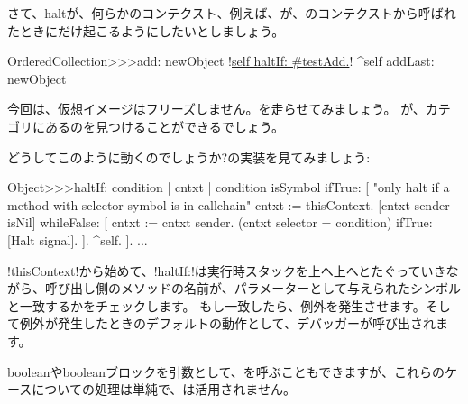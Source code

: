 \documentclass[a4paper,10pt,twoside]{book}
\begin{document}
さて、haltが、何らかのコンテクスト、例えば、が、のコンテクストから呼ばれたときにだけ起こるようにしたいとしましょう。%

\begin{code}{}
OrderedCollection>>>add: newObject
	!\underline{self haltIf: \#testAdd.}!
	^self addLast: newObject
\end{code}

今回は、仮想イメージはフリーズしません。を走らせてみましょう。
が、カテゴリにあるのを見つけることができるでしょう。%

どうしてこのように動くのでしょうか?の実装を見てみましょう:
\begin{code}{}
Object>>>haltIf: condition
	| cntxt |
	condition isSymbol ifTrue: [
		"only halt if a method with selector symbol is in callchain"
		cntxt := thisContext.
		[cntxt sender isNil] whileFalse: [
			cntxt := cntxt sender. 
			(cntxt selector = condition) ifTrue: [Halt signal]. ].
		^self.
	].
	...
\end{code}

\ct!thisContext!から始めて、\ct!haltIf:!は実行時スタックを上へ上へとたぐっていきながら、呼び出し側のメソッドの名前が、パラメーターとして与えられたシンボルと一致するかをチェックします。
もし一致したら、例外を発生させます。そして例外が発生したときのデフォルトの動作として、デバッガーが呼び出されます。

booleanやbooleanブロックを引数として、を呼ぶこともできますが、これらのケースについての処理は単純で、は活用されません。
\end{document}
